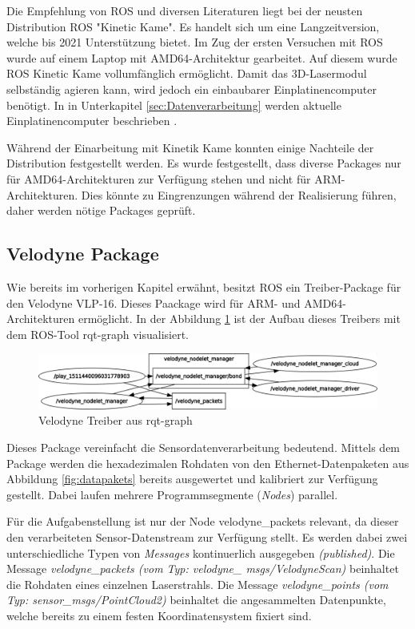 Die Empfehlung von ROS und diversen Literaturen liegt bei der neusten Distribution ROS "Kinetic Kame". \cite{ROSprojects} Es handelt sich um eine Langzeitversion, welche bis 2021 Unterstützung bietet. Im Zug der ersten Versuchen mit ROS wurde auf einem Laptop mit \ac{AMD64}-Architektur gearbeitet. Auf diesem wurde ROS Kinetic Kame vollumfänglich ermöglicht. Damit das 3D-Lasermodul selbständig agieren kann, wird jedoch ein einbaubarer Einplatinencomputer benötigt. In in Unterkapitel \ref{sec:Datenverarbeitung} werden aktuelle Einplatinencomputer beschrieben . 

Während der Einarbeitung mit Kinetik Kame konnten einige Nachteile der Distribution festgestellt werden. Es wurde festgestellt, dass diverse Packages nur für \ac{AMD64}-Architekturen zur Verfügung stehen und nicht für \ac{ARM}-Architekturen. \cite{armhf_issues} Dies könnte zu Eingrenzungen während der Realisierung führen, daher werden nötige Packages geprüft.

\subsection{Velodyne Package}
Wie bereits im vorherigen Kapitel erwähnt, besitzt ROS ein Treiber-Package für den Velodyne VLP-16. Dieses Paackage wird für ARM- und AMD64-Architekturen ermöglicht. In der Abbildung \ref{fig:rosgraph} ist der Aufbau dieses Treibers mit dem ROS-Tool rqt-graph visualisiert. 

\begin{figure}[H]
	\centering
	\includegraphics[width=1\textwidth]{resources/rosgraph.png}
	\caption[Velodyne Treiber aus rqt-graph ]{Velodyne Treiber aus rqt-graph}
	\label{fig:rosgraph}
\end{figure} 

Dieses Package vereinfacht die Sensordatenverarbeitung bedeutend. Mittels dem Package werden die hexadezimalen Rohdaten von den Ethernet-Datenpaketen aus Abbildung \ref{fig:datapakets} bereits ausgewertet und kalibriert zur Verfügung gestellt. Dabei laufen mehrere Programmsegmente (\textit{Nodes}) parallel. 

Für die Aufgabenstellung ist nur der Node velodyne\_packets relevant, da dieser den verarbeiteten Sensor-Datenstream zur Verfügung stellt. Es werden dabei zwei unterschiedliche Typen von \textit{Messages} kontinuerlich ausgegeben \textit{(published)}. Die Message \textit{velodyne\_packets (vom Typ: velodyne\_ msgs/VelodyneScan)} beinhaltet die Rohdaten eines einzelnen Laserstrahls. Die Message \textit{velodyne\_points (vom Typ: sensor\_msgs/PointCloud2)} beinhaltet die angesammelten Datenpunkte, welche bereits zu einem festen Koordinatensystem fixiert sind. \cite{ROSvelodyne}

